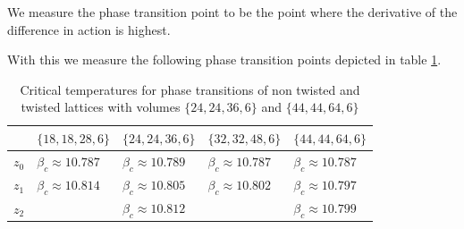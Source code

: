\documentclass[english,twoside,openright]{UH_TCM_MSc}
\begin{document}
We measure the phase transition point to be the point where the derivative of the difference in action is highest.

With this we measure the following phase transition points depicted in table \ref{table:critical_temperature}.
\begin{table}[htb]
\centering
\begin{tabular}{|l|l|l|l|l|}
\hline
      & $\{18,18,28,6\}$       & $\{24,24,36,6\}$       & $\{32,32,48,6\}$       & $\{44,44,64,6\}$       \\ \hline
$z_0$ & $\beta_c\approx10.787$ & $\beta_c\approx10.789$ & $\beta_c\approx10.787$ & $\beta_c\approx10.787$ \\ \hline
$z_1$ & $\beta_c\approx10.814$ & $\beta_c\approx10.805$ & $\beta_c\approx10.802$ & $\beta_c\approx10.797$ \\ \hline
$z_2$ &                        & $\beta_c\approx10.812$ &                        & $\beta_c\approx10.799$ \\ \hline
\end{tabular}
\caption{Critical temperatures for phase transitions of non twisted and twisted lattices with volumes $\{24,24,36,6\}$ and $\{44,44,64,6\}$}
\label{table:critical_temperature}
\end{table}
\end{document}
